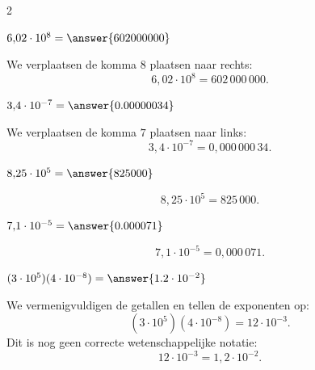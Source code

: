 \documentclass{ximera}
\begin{document}
\begin{oefening}{\oefB\ESS}
\begin{multicols}{2}
            
            \begin{question}
            $6{,}02\cdot10^{8}
            =\answer{602000000}$
            
            \begin{oplossing}
            We verplaatsen de komma $8$ plaatsen naar rechts:
            \[
            6{,}02\cdot10^8
            =602\,000\,000.
            \]
            \end{oplossing}
            \end{question}
            
            
            \begin{question}
            $3{,}4\cdot10^{-7}
            =\answer{0.00000034}$
            
            \begin{oplossing}
            We verplaatsen de komma $7$ plaatsen naar links:
            \[
            3{,}4\cdot10^{-7}
            =0{,}000\,000\,34.
            \]
            \end{oplossing}
            \end{question}
            
            
            \begin{question}
            $8{,}25\cdot10^5
            =\answer{825000}$
            
            \begin{oplossing}
            \[
            8{,}25\cdot10^5
            =825\,000.
            \]
            \end{oplossing}
            \end{question}
            
            
            \begin{question}
            $7{,}1\cdot10^{-5}
            =\answer{0.000071}$
            
            \begin{oplossing}
            \[
            7{,}1\cdot10^{-5}
            =0{,}000\,071.
            \]
            \end{oplossing}
            \end{question}
            
            
            \begin{question}
            $(3\cdot10^5)(4\cdot10^{-8})
            =\answer{1.2\cdot10^{-2}}$
            
            \begin{oplossing}
            We vermenigvuldigen de getallen en tellen de exponenten op:
            \[
            (3\cdot10^5)(4\cdot10^{-8})
            =12\cdot10^{-3}.
            \]
            Dit is nog geen correcte wetenschappelijke notatie:
            \[
            12\cdot10^{-3}
            =1{,}2\cdot10^{-2}.
            \]
            \end{oplossing}
            \end{question}
            

\end{multicols}
\end{oefening}
\end{document}
